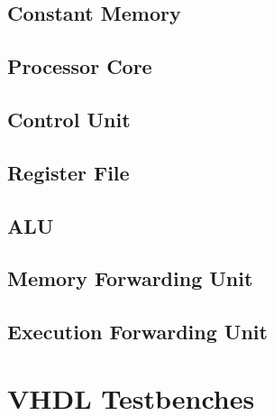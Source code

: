 \clearpage
\subsection{Constant Memory}\label{vhdl:constant-memory}


\clearpage
\subsection{Processor Core}\label{vhdl:core}


\clearpage
\subsection{Control Unit}\label{vhdl:control-unit}


\clearpage
\subsection{Register File}\label{vhdl:register-file}


\clearpage
\subsection{ALU}\label{vhdl:alu}


\clearpage
\subsection{Memory Forwarding Unit}\label{vhdl:forwarding-unit-mem}


\clearpage
\subsection{Execution Forwarding Unit}\label{vhdl:forwarding-unit-exec}





\clearpage
\section{VHDL Testbenches}

